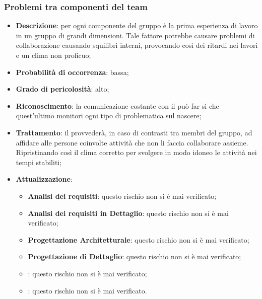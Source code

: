 		\subsubsection{Problemi tra componenti del team}
		\begin{itemize}
			\item \textbf{Descrizione}: per ogni componente del gruppo è la prima esperienza di lavoro in un gruppo di grandi dimensioni. Tale fattore potrebbe causare problemi di collaborazione causando squilibri interni, provocando così dei ritardi nei lavori e un clima non proficuo; 
			\item \textbf{Probabilità di occorrenza}: bassa;
			\item \textbf{Grado di pericolosità}: alto;
			\item \textbf{Riconoscimento}: la comunicazione costante con il \textit{\Res} può far sì che quest'ultimo monitori ogni tipo di problematica sul nascere;  
			\item \textbf{Trattamento}: il \textit{\Res} provvederà, in caso di contrasti tra membri del gruppo, ad affidare alle persone coinvolte attività che non li faccia collaborare assieme. Ripristinando così il clima corretto per svolgere in modo idoneo le attività nei tempi stabiliti;
			\item \textbf{Attualizzazione}:
			\begin{itemize}
				\item \textbf{Analisi dei requisiti}: questo rischio non si è mai verificato;
				\item \textbf{Analisi dei requisiti in Dettaglio}: questo rischio non si è mai verificato;
				\item \textbf{Progettazione Architetturale}: questo rischio non si è mai verificato;
				\item \textbf{Progettazione di Dettaglio}: questo rischio non si è mai verificato;
				\item \textbf{\CO}: questo rischio non si è mai verificato;
				\item \textbf{\VV}: questo rischio non si è mai verificato.
			\end{itemize}
		\end{itemize}
		
